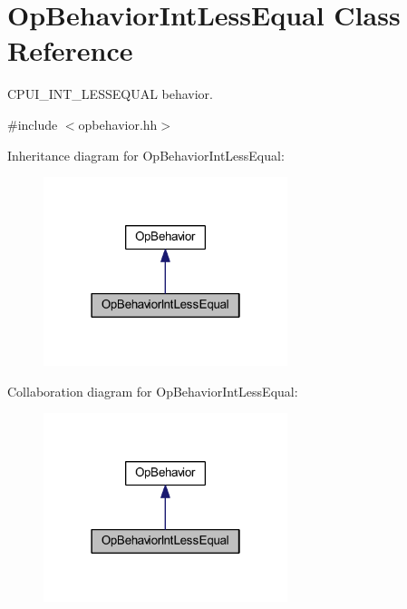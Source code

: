 \hypertarget{class_op_behavior_int_less_equal}{}\section{Op\+Behavior\+Int\+Less\+Equal Class Reference}
\label{class_op_behavior_int_less_equal}


C\+P\+U\+I\+\_\+\+I\+N\+T\+\_\+\+L\+E\+S\+S\+E\+Q\+U\+AL behavior.  




{\ttfamily \#include $<$opbehavior.\+hh$>$}



Inheritance diagram for Op\+Behavior\+Int\+Less\+Equal\+:
\nopagebreak
\begin{figure}[H]
\begin{center}
\leavevmode
\includegraphics[width=202pt]{class_op_behavior_int_less_equal__inherit__graph}
\end{center}
\end{figure}


Collaboration diagram for Op\+Behavior\+Int\+Less\+Equal\+:
\nopagebreak
\begin{figure}[H]
\begin{center}
\leavevmode
\includegraphics[width=202pt]{class_op_behavior_int_less_equal__coll__graph}
\end{center}
\end{figure}

